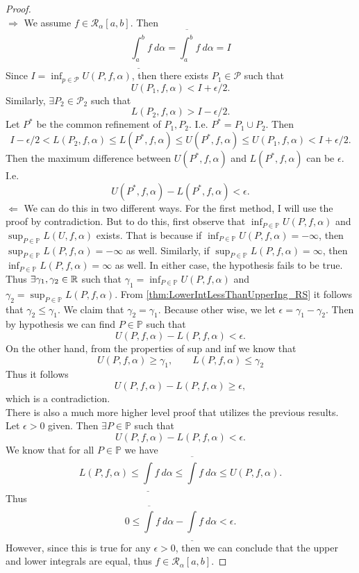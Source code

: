 \begin{proof}$\ $ \\
	\noindent $\boxed{\Longrightarrow}$ We assume $f\in \mathcal{R}_\alpha[a,b]$. Then 
	\[ \underline{\int_{a}^{b}}f\ d\alpha = \overline{\int_{a}^{b}}f\ d\alpha = I \]
	Since $I = \inf_{p\in\mathcal{P}}U(P,f,\alpha)$, then there exists $P_1 \in\mathcal{P}$ such that 
	\[ U(P_1,f,\alpha) < I + \epsilon/2. \]
	Similarly, $\exists P_2 \in \mathcal{P_2}$ such that
	\[ L(P_2,f,\alpha) > I - \epsilon/2. \]
	Let $P^*$ be the common refinement of $P_1, P_2$. I.e. $P^* = P_1\cup P_2$. Then 
	\[ I-\epsilon/2 < L(P_2,f,\alpha)\leq L(P^*,f,\alpha)\leq U(P^*,f,\alpha) \leq U(P_1,f,\alpha) < I + \epsilon/2. \]
	Then the maximum difference between $U(P^*,f,\alpha)$ and $L(P^*,f,\alpha)$ can be $\epsilon$. I.e.
	\[ U(P^*,f,\alpha) - L(P^*,f,\alpha) < \epsilon. \]
	\noindent $\boxed{\Longleftarrow}$ We can do this in two different ways. For the first method, I will use the proof by contradiction. But to do this, first observe that $\inf_{P \in \mathbb{P}} U(P,f,\alpha)$ and $\sup_{P\in \mathbb{P}}L(U,f,\alpha)$ exists. That is because if $\inf_{P \in \mathbb{P}}U(P,f,\alpha) = -\infty$, then $\sup_{P\in \mathbb{P}}L(P,f,\alpha) = -\infty$ as well. Similarly, if $\sup_{P\in \mathbb{P}}L(P,f,\alpha)=\infty$, then $\inf_{P \in \mathbb{P}}L(P,f,\alpha) = \infty$ as well. In either case, the hypothesis fails to be true. Thus $\exists \gamma_1, \gamma_2 \in \mathbb{R}$ such that $\gamma_1 = \inf_{P \in \mathbb{P}}U(P,f,\alpha)$ and $\gamma_2 = \sup_{P\in \mathbb{P}}L(P,f,\alpha)$. From \autoref{thm:LowerIntLessThanUpperIng_RS} it follows that $\gamma_2 \leq \gamma_1$. We claim that $\gamma_2 = \gamma_1$. Because other wise, we let $\epsilon = \gamma_1 - \gamma_2$. Then by hypothesis we can find $P \in \mathbb{P}$ such that 
	\[ U(P,f,\alpha) - L(P,f,\alpha) < \epsilon. \] On the other hand, from the properties of sup and inf we know that
	\[ U(P,f,\alpha) \geq \gamma_1, \qquad L(P,f,\alpha) \leq \gamma_2\]
	Thus it follows 
	\[ U(P,f,\alpha) - L(P,f,\alpha) \geq \epsilon,\]
	which is a contradiction.\\
	There is also a much more higher level proof that utilizes the previous results. Let $\epsilon>0$ given. Then $\exists P \in \mathbb{P}$ such that
	\[ U(P,f,\alpha) - L(P,f,\alpha) < \epsilon. \]
	We know that for all $P \in \mathbb{P}$ we have
	\[ L(P,f,\alpha) \leq \underline{\int}f\ d\alpha \leq \overline{\int}f\ d\alpha  \leq U(P,f,\alpha). \]
	Thus
	\[ 0 \leq \overline{\int}f\ d\alpha - \underline{\int}f\ d\alpha  < \epsilon. \]
	However, since this is true for any $\epsilon>0$, then we can conclude that the upper and lower integrals are equal, thus $f \in \mathcal{R}_\alpha[a,b]$.
\end{proof}

